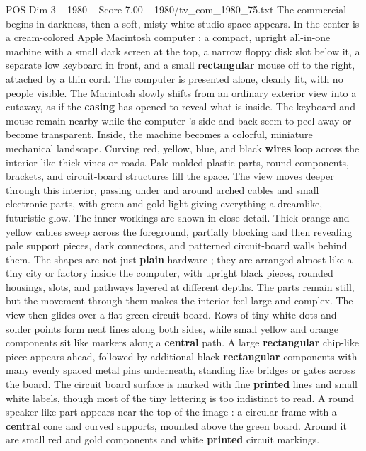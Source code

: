 \begin{textsample}{POS Dim 3 – 1980 – Score 7.00 – 1980/tv\_com\_1980\_75.txt}  \label{ex:f3_pos_046}
The commercial begins in darkness, then a soft, misty white studio space appears.
In the center is a cream-colored Apple Macintosh computer : a compact, upright all-in-one machine with a small dark screen at the top, a narrow floppy disk slot below it, a separate low keyboard in front, and a small \textbf{rectangular} mouse off to the right, attached by a thin cord.
The computer is presented alone, cleanly lit, with no people visible.
The Macintosh slowly shifts from an ordinary exterior view into a cutaway, as if the \textbf{casing} has opened to reveal what is inside.
The keyboard and mouse remain nearby while the computer ’s side and back seem to peel away or become transparent.
Inside, the machine becomes a colorful, miniature mechanical landscape.
Curving red, yellow, blue, and black \textbf{wires} loop across the interior like thick vines or roads.
Pale molded plastic parts, round components, brackets, and circuit-board structures fill the space.
The view moves deeper through this interior, passing under and around arched cables and small electronic parts, with green and gold light giving everything a dreamlike, futuristic glow.
The inner workings are shown in close detail.
Thick orange and yellow cables sweep across the foreground, partially blocking and then revealing pale support pieces, dark connectors, and patterned circuit-board walls behind them.
The shapes are not just \textbf{plain} hardware ; they are arranged almost like a tiny city or factory inside the computer, with upright black pieces, rounded housings, slots, and pathways layered at different depths.
The parts remain still, but the movement through them makes the interior feel large and complex.
The view then glides over a flat green circuit board.
Rows of tiny white dots and solder points form neat lines along both sides, while small yellow and orange components sit like markers along a \textbf{central} path.
A large \textbf{rectangular} chip-like piece appears ahead, followed by additional black \textbf{rectangular} components with many evenly spaced metal pins underneath, standing like bridges or gates across the board.
The circuit board surface is marked with fine \textbf{printed} lines and small white labels, though most of the tiny lettering is too indistinct to read.
A round speaker-like part appears near the top of the image : a circular frame with a \textbf{central} cone and curved supports, mounted above the green board.
Around it are small red and gold components and white \textbf{printed} circuit markings.

\end{textsample}
